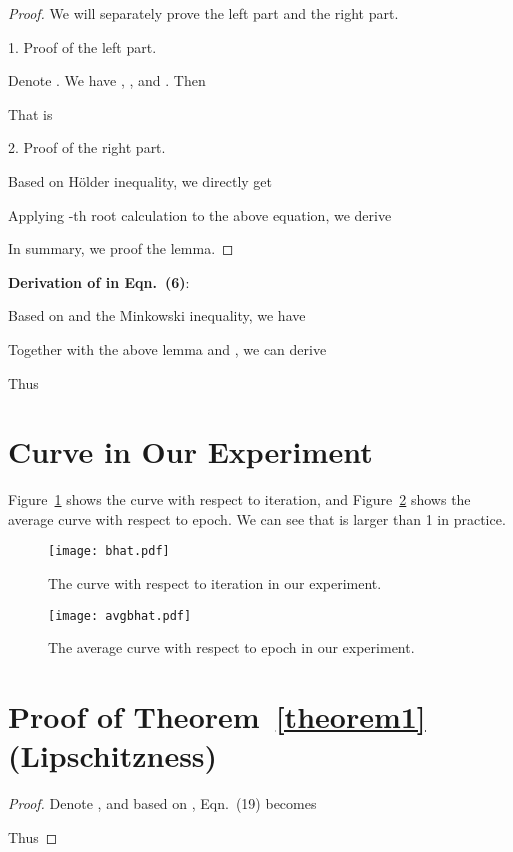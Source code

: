 \documentclass[sigconf]{acmart}
\begin{document}
\begin{proof}
We will separately prove the left part and the right part.

1. Proof of the left part.

Denote . We have , , and . Then


That is





2. Proof of the right part.

Based on H\"older inequality, we directly get


Applying -th root calculation to the above equation, we derive


In summary, we proof the lemma.
\end{proof}

\textbf{Derivation of  in Eqn.~(6)}:

Based on  and the Minkowski inequality, we have


Together with the above lemma and , we can derive


Thus


\section{ Curve in Our Experiment}
\label{sec:supp_b}
Figure~\ref{fig:bhat} shows the  curve with respect to iteration, and Figure~\ref{fig:avg bhat} shows the average  curve with respect to epoch. We can see that  is larger than 1 in practice.
\begin{figure}[!htb]
    \centering
    \texttt{[image: bhat.pdf]}
    \caption{The  curve with respect to iteration in our experiment.}
    \label{fig:bhat}
\end{figure}

\begin{figure}[!htb]
    \centering
    \texttt{[image: avgbhat.pdf]}
    \caption{The average  curve with respect to epoch in our experiment.}
    \label{fig:avg bhat}
\end{figure}

\section{Proof of Theorem~\ref{theorem1} (Lipschitzness)}
\label{sec:supp_c}
\begin{proof}
Denote , and based on , Eqn.~(19) becomes


Thus

\end{proof}
\end{document}
